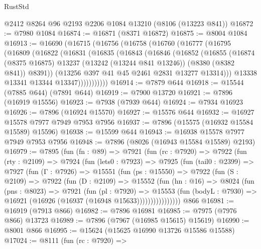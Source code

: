 \begin{lexlean}{RustStd}
\begin{coremodule}
    @2412
    @8264
    @96
    @2193
    @2206
    @1084
    @13210
    (@8106 (@13223 @841))
@16872 := @7980 @1084
@16874 := @16871 (@8371 @16872)
@16875 := @8004 @1084
@16913 := @16690
    (@16715
      (@16756
        (@16758
          (@16760
            (@16777
              (@16795
                (@16809
                  (@16822
                    (@16831
                      (@16835
                        (@16843
                          (@16846
                            (@16852
                              (@16855
                                (@16874
                                  (@8375 @16875)
                                  @13237
                                  (@13242 (@13244 @841 @13246))
                                  (@8380 (@8382 @841))
                                  @8391))
                              (@13256 @397 @41 @45 @2461 @2831 @13277 @13314)))
                          @13338
                          @13341
                          @13344
                          @13347)))))))))))
@16914 := @7879 @644
@16918 := @15544 (@7885 @644) (@7891 @644)
@16919 := @7900 @13720
@16921 := @7896 (@16919 @15556)
@16923 := @7938 (@7939 @644)
@16924 := @7934 @16923
@16926 := @7896 (@16924 @15570)
@16927 := @15576 @644
@16932 := @16927 @15578 @7977 @7949 @7953 @7956
@16937 := @7896 (@15575 (@16932 @15584 @15589) @15596)
@16938 := @15599 @644
@16943 := @16938 @15578 @7977 @7949 @7953 @7956
@16948 := @7896 (@8026 (@16943 @15584 @15589) @2193)
@16979 := @7895
    (fun (fn : @89) =>
    @7921
      (fun (rc : @7920) =>
      @7922
        (fun (rty : @2109) =>
        @7924
          (fun (lets0 : @7923) =>
          @7925
            (fun (tail0 : @2399) =>
            @7927
              (fun (Γ : @7926) =>
              @15551
                (fun (ps : @15550) =>
                @7922
                  (fun (S : @2109) =>
                  @7922
                    (fun (D : @2109) =>
                    @15552
                      (fun (hn : @16) =>
                      @8024
                        (fun (pns : @8023) =>
                        @7921
                          (fun (pl : @7920) =>
                          @15553
                            (fun (bodyL : @7930) =>
                            @16921 (@16926 (@16937 (@16948 @15633))))))))))))))))
    @866
@16981 := @16919 (@7913 @866)
@16982 := @7896 @16981
@16985 := @7975 (@7976 @866) @13723
@16989 := @7896 (@7967 (@16985 @15615) @15619)
@16990 := @8001 @866
@16995 := @15624 (@15625 @16990 @13726 @15586 @15588)
@17024 := @8111
    (fun (rc : @7920) =>

\end{coremodule}
\end{lexlean}

